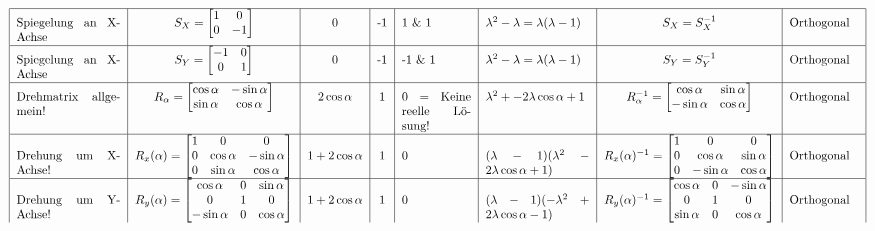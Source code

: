 \begin{sidewaystable}
\begin{equation*}
\begin{tabular}{|p{3cm}|c|c|c|p{2cm}|p{3cm}|c|p{2cm}|}
				\hline
					Spiegelung an X-Achse & $S_{X} = \begin{bmatrix} 1 & 0 \\ 0 & -1 \end{bmatrix}$ & 0 & -1 & 1 \& 1 & $
					\lambda^2 - \lambda = \lambda (\lambda - 1)$ & $S_{X} = S_{X}^{-1}$ & Orthogonal \\
				\hline
					Spiegelung an X-Achse & $S_{Y} = \begin{bmatrix} -1 & 0 \\ 0 & 1 \end{bmatrix}$ & 0 & -1 & -1 \& 1 & $
					\lambda^2 - \lambda = \lambda (\lambda - 1)$ & $S_{Y} = S_{Y}^{-1}$ & Orthogonal \\
				\hline
					Drehmatrix allgemein! & $R_{\alpha} = \begin{bmatrix} \cos{\alpha} & -\sin{\alpha} \\ \sin{\alpha} & \cos{\alpha} \end{bmatrix}$ & $2 \cos{\alpha}$ & 1 & 0 = Keine reelle Lösung! & $\lambda^2 + -2 \lambda \cos{\alpha} + 1$ & $R_{\alpha}^{-1} = \begin{bmatrix} \cos{\alpha} & \sin{\alpha} \\ -\sin{\alpha} & \cos{\alpha} \end{bmatrix}$ & Orthogonal \\
				\hline
					Drehung um X-Achse! & $R_{x}(\alpha) = \begin{bmatrix} 1 & 0 & 0 \\ 0 & \cos{\alpha} & -\sin{\alpha} \\ 
					0 & \sin{\alpha} & \cos{\alpha} \end{bmatrix}$ & $1 + 2 \cos{\alpha}$ & 1 & 0 & 
					$(\lambda - 1)(\lambda^2 - 2 \lambda \cos{\alpha} + 1)$ & $R_{x}(\alpha)^{-1} = \begin{bmatrix} 1 & 0 & 0 \\ 0 & \cos{\alpha} & \sin{\alpha} \\ 0 & -\sin{\alpha} & \cos{\alpha} \end{bmatrix}$ & Orthogonal \\
				\hline
					Drehung um Y-Achse! & $R_{y}(\alpha) = \begin{bmatrix} \cos{\alpha} & 0 & \sin{\alpha} \\ 
					0 & 1 & 0 \\ -\sin{\alpha} & 0 & \cos{\alpha} \end{bmatrix}$ & $1 + 2 \cos{\alpha}$ & 1 & 0 & 
					$(\lambda - 1)(-\lambda^2 + 2 \lambda \cos{\alpha} - 1)$ & $R_{y}(\alpha)^{-1} = \begin{bmatrix} \cos{\alpha} & 0 & -\sin{\alpha} \\ 0 & 1 & 0 \\ \sin{\alpha} & 0 & \cos{\alpha} \end{bmatrix}$ & Orthogonal \\

\end{tabular}
\end{equation*}
\end{sidewaystable}
